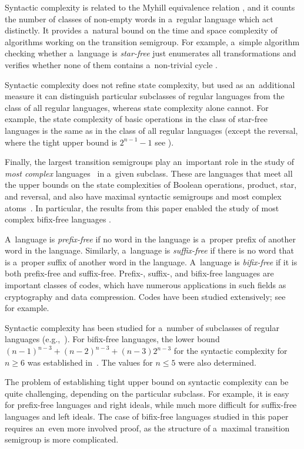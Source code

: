 \documentclass{amsart}
\renewcommand{\le}{\leqslant}
\renewcommand{\ge}{\geqslant}
\begin{document}
Syntactic complexity is related to the Myhill equivalence relation \cite{Myh57}, and it counts the number of classes of non-empty words in a~regular language which act distinctly.
It provides a~natural bound on the time and space complexity of algorithms working on the transition semigroup.
For example, a~simple algorithm checking whether a~language is \emph{star-free} just enumerates all transformations and verifies whether none of them contains a~non-trivial cycle \cite{McSe71}.

Syntactic complexity does not refine state complexity, but used as an~additional measure it can distinguish particular subclasses of regular languages from
the class of all regular languages, whereas state complexity alone cannot.
For example, the state complexity of basic operations in the class of star-free languages is the same as in the class of all regular languages (except the reversal, where the tight upper bound is $2^{n-1}-1$ see \cite{BrSz15Aperiodic}).

Finally, the largest transition semigroups play an~important role in the study of \emph{most complex} languages~\cite{Brz13} in a~given subclass.
These are languages that meet all the upper bounds on the state complexities of Boolean operations, product, star, and reversal, and also have maximal syntactic semigroups and most complex atoms~\cite{BrTa14}.
In particular, the results from this paper enabled the study of most complex bifix-free languages \cite{FeSz17ComplexityOfBifixFree}.

A~language is \emph{prefix-free} if no word in the language is a~proper prefix of another word in the language.
Similarly, a~language is \emph{suffix-free} if there is no word that is a~proper suffix of another word in the language.
A~language is \emph{bifix-free} if it is both prefix-free and suffix-free.
Prefix-, suffix-, and bifix-free languages are important classes of codes, which have numerous applications in such fields as cryptography and data compression.
Codes have been studied extensively; see~\cite{BPR09} for example.

Syntactic complexity has been studied for a~number of subclasses of regular languages (e.g.,~\cite{BrLi15,BLL12,BLY12,BrSz15Aperiodic,HoKo04,IvNa14}).
For bifix-free languages, the lower bound $(n-1)^{n-3}+(n-2)^{n-3}+(n-3)2^{n-3}$ for the syntactic complexity for $n \ge 6$ was established in~\cite{BLY12}. The values for $n \le 5$ were also determined.

The problem of establishing tight upper bound on syntactic complexity can be quite challenging, depending on the particular subclass.
For example, it is easy for prefix-free languages and right ideals, while much more difficult for suffix-free languages and left ideals.
The case of bifix-free languages studied in this paper requires an~even more involved proof, as the structure of a~maximal transition semigroup is more complicated.
\end{document}
